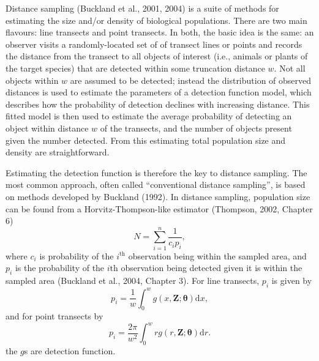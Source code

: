 \documentclass[useAMS,referee, usegraphicx]{biom}
\begin{document}
Distance sampling (Buckland et al., 2001, 2004) is a suite of methods for estimating the size and/or density of biological populations.  There are two main flavours: line transects and point transects.  In both, the basic idea is the same: an observer visits a randomly-located set of of transect lines or points and records the distance from the transect to all objects of interest (i.e., animals or plants of the target species) that are detected within some truncation distance $w$.  Not all objects within $w$ are assumed to be detected; instead the distribution of observed distances is used to estimate the parameters of a detection function model, which describes how the probability of detection declines with increasing distance.  This fitted model is then used to estimate the average probability of detecting an object within distance $w$ of the transects, and the number of objects present given the number detected. From this estimating total population size and density are straightforward.

Estimating the detection function is therefore the key to distance sampling.  The most common approach, often called ``conventional distance sampling'', is based on methods developed by Buckland (1992). In distance sampling, population size can be found from a Horvitz-Thompson-like estimator (Thompson, 2002, Chapter 6)
\begin{equation}
N = \sum_{i=1}^n \frac{1}{c_i p_i},
\label{HT}
\end{equation}
where $c_i$ is probability of the $i^\text{th}$ observation being within the sampled area, and $p_i$ is the probability of the $i\text{th}$ observation being detected given it is within the sampled area (Buckland et al., 2004, Chapter 3).  For line transects, $p_i$ is given by
\begin{equation*}
p_i = \frac{1}{w} \int_0^w  g(x,\mathbf{Z}; \bm{\theta}) \text{d}x,
\end{equation*}
and for point transects by
\begin{equation*}
p_i = \frac{2\pi}{w^2} \int_0^w  r g(r,\mathbf{Z}; \bm{\theta}) \text{d}r.
\end{equation*}
the $g$s are detection function.
\end{document}
